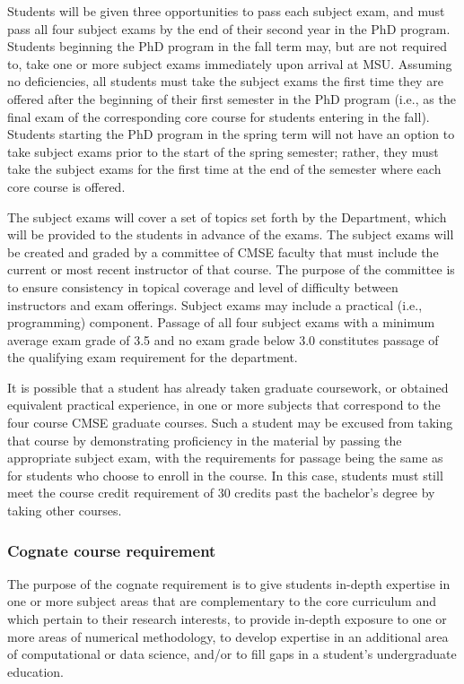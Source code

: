 Students will be given three opportunities to pass each subject exam,
and must pass all four subject exams by the end of their second year
in the PhD program.  Students beginning the PhD program in the fall
term may, but are not required to, take one or more subject exams
immediately upon arrival at MSU.  Assuming no deficiencies, all
students must take the subject exams the first time they are offered
after the beginning of their first semester in the PhD program (i.e.,
as the final exam of the corresponding core course for students
entering in the fall).  Students starting the PhD program in the
spring term will not have an option to take subject exams prior to the
start of the spring semester; rather, they must take the subject exams
for the first time at the end of the semester where each core course
is offered.

The subject exams will cover a set of topics set forth by the
Department, which will be provided to the students in advance of the
exams. The subject exams will be created and graded by a committee of
CMSE faculty that must include the current or most recent instructor
of that course.  The purpose of the committee is to ensure consistency
in topical coverage and level of difficulty between instructors and
exam offerings.  Subject exams may include a practical (i.e.,
programming) component.  Passage of all four subject exams with a
minimum average exam grade of 3.5 and no exam grade below 3.0
constitutes passage of the qualifying exam requirement for the
department.

It is possible that a student has already taken graduate coursework,
or obtained equivalent practical experience, in one or more subjects
that correspond to the four course CMSE graduate courses.  Such a
student may be excused from taking that course by demonstrating
proficiency in the material by passing the appropriate subject exam,
with the requirements for passage being the same as for students who
choose to enroll in the course.  In this case, students must still
meet the course credit requirement of 30 credits past the bachelor's
degree by taking other courses.

\vspace{3mm}
\subsubsection{Cognate course requirement}

The purpose of the cognate requirement is to give students in-depth
expertise in one or more subject areas that are complementary to the
core curriculum and which pertain to their research interests, to
provide in-depth exposure to one or more areas of numerical
methodology, to develop expertise in an additional area of
computational or data science, and/or to fill gaps in a student's
undergraduate education.

